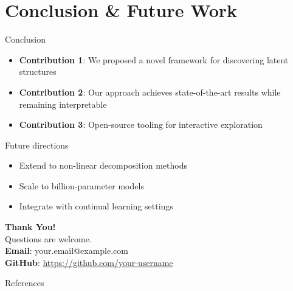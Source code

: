 \documentclass{beamer}
\begin{document}
\section[Conclusion]{Conclusion \& Future Work}

\begin{frame}{Conclusion}
    \begin{itemize}
        \setlength{\itemsep}{0.8em}
        \item \textcolor{ECNURed}{\textbf{Contribution 1}}: We proposed a novel framework for discovering latent structures
        \item \textcolor{ECNURed}{\textbf{Contribution 2}}: Our approach achieves state-of-the-art results while remaining interpretable
        \item \textcolor{ECNURed}{\textbf{Contribution 3}}: Open-source tooling for interactive exploration
    \end{itemize}
    \vspace{0.4cm}
    \begin{block}{Future directions}
        \begin{itemize}
            \item Extend to non-linear decomposition methods
            \item Scale to billion-parameter models
            \item Integrate with continual learning settings
        \end{itemize}
    \end{block}
\end{frame}

\begin{frame}{}
    \vspace{1.5cm}
    \begin{center}
        {\Huge\bfseries Thank You!}\\[0.8cm]
        {\Large Questions are welcome.}\\[1cm]
        {\normalsize
            \textcolor{ECNURed}{\textbf{Email}}: your.email@example.com\\[0.3cm]
            \textcolor{ECNURed}{\textbf{GitHub}}: \url{https://github.com/your-username}
        }
    \end{center}
\end{frame}

\begin{frame}[allowframebreaks]{References}
    \printbibliography[heading=none]
\end{frame}
\end{document}
